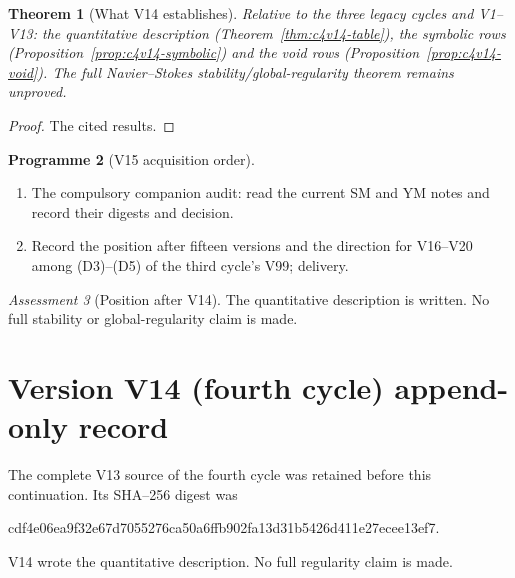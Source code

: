\documentclass[11pt]{article}
\theoremstyle{plain}
\newtheorem{theorem}{Theorem}[section]
\theoremstyle{definition}
\newtheorem{programme}[theorem]{Programme}
\theoremstyle{remark}
\newtheorem{assessment}[theorem]{Assessment}
\begin{document}
\begin{theorem}[What V14 establishes]
\label{thm:c4v14-conclusion}
Relative to the three legacy cycles and V1--V13: the quantitative
description (Theorem~\ref{thm:c4v14-table}), the symbolic rows
(Proposition~\ref{prop:c4v14-symbolic}) and the void rows
(Proposition~\ref{prop:c4v14-void}).  The full Navier--Stokes
stability/global-regularity theorem remains unproved.
\end{theorem}

\begin{proof}
The cited results.
\end{proof}

\begin{programme}[V15 acquisition order]
\label{prog:c4v15}
\begin{enumerate}[label=\textup{(AC\arabic*)},leftmargin=4.8em]
\item The compulsory companion audit: read the current SM and YM
      notes and record their digests and decision.
\item Record the position after fifteen versions and the direction
      for V16--V20 among (D3)--(D5) of the third cycle's V99; delivery.
\end{enumerate}
\end{programme}

\begin{assessment}[Position after V14]
\label{ass:c4v14-position}
The quantitative description is written.  No full stability or
global-regularity claim is made.
\end{assessment}

\section*{Version V14 (fourth cycle) append-only record}

The complete V13 source of the fourth cycle was retained before this
continuation.  Its SHA--256 digest was
\begin{center}\scriptsize\ttfamily
cdf4e06ea9f32e67d7055276ca50a6ffb902fa13d31b5426d411e27ecee13ef7.
\end{center}
V14 wrote the quantitative description.  No full regularity claim
is made.

\end{document}
